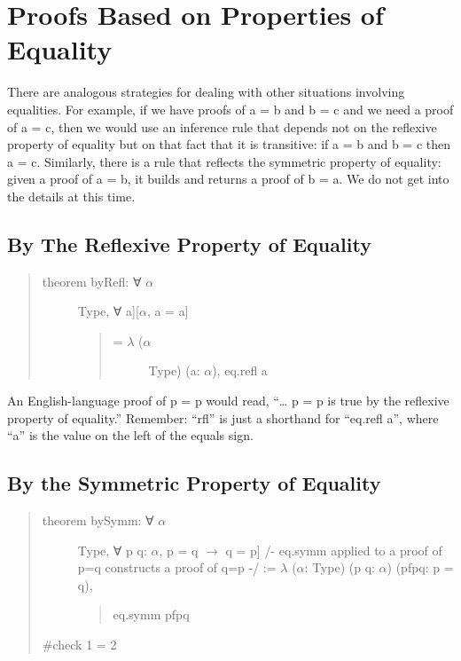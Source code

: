 \documentclass[letterpaper,10pt,english]{sphinxmanual}
\begin{document}
\section{Proofs Based on Properties of Equality}
\label{\detokenize{16-equality:proofs-based-on-properties-of-equality}}
There are analogous strategies for dealing with other situations
involving equalities.  For example, if we have proofs of a = b and b =
c and we need a proof of a = c, then we would use an inference rule
that depends not on the reflexive property of equality but on that
fact that it is transitive: if a = b and b = c then a = c. Similarly,
there is a rule that reflects the symmetric property of equality:
given a proof of a = b, it builds and returns a proof of b = a. We do
not get into the details at this time.


\subsection{By The Reflexive Property of Equality}
\label{\detokenize{16-equality:by-the-reflexive-property-of-equality}}\begin{quote}
\begin{description}
\item[{theorem byRefl: ∀ \(\alpha\)}] \leavevmode{[}Type, ∀ a{]}{[}\(\alpha\), a = a{]}\begin{quote}\begin{description}
\item[{= \(\lambda\) (\(\alpha\)}] \leavevmode
Type) (a: \(\alpha\)), eq.refl a

\end{description}\end{quote}

\end{description}
\end{quote}

An English-language proof of p = p would read, “… p = p is true by
the reflexive property of equality.”  Remember: “rfl” is just a
shorthand for “eq.refl a”, where “a” is the value on the left of the
equals sign.


\subsection{By the Symmetric Property of Equality}
\label{\detokenize{16-equality:by-the-symmetric-property-of-equality}}\begin{quote}
\begin{description}
\item[{theorem bySymm: ∀ \(\alpha\)}] \leavevmode{[}Type, ∀ p q: \(\alpha\), p = q \(\rightarrow\) q = p{]}
/-
eq.symm applied to a proof of
p=q constructs a proof of q=p
-/
:= \(\lambda\) (\(\alpha\): Type) (p q: \(\alpha\)) (pfpq: p = q),
\begin{quote}

eq.symm pfpq
\end{quote}

\end{description}

\#check 1 = 2
\end{quote}
\end{document}
